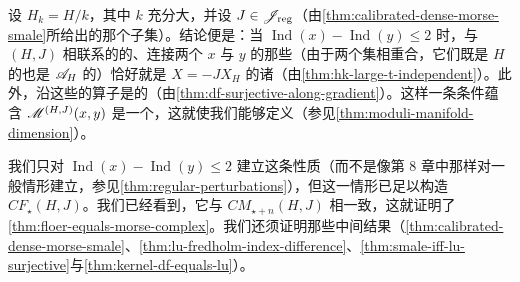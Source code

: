 设 $H_{k}=H/k$，其中 $k$ 充分大，并设 $J\in\mathscr{J}_{\mathrm{reg}}$（由\cref{thm:calibrated-dense-morse-smale}所给出的那个\trDense{}子集）。结论便是：当 $\operatorname{Ind}(x)-\operatorname{Ind}(y)\le 2$ 时，与 $(H,J)$ 相联系的\trFloerEquation{}的、连接两个\trCriticalPoint{} $x$ 与 $y$ 的那些\trTrajectory（由于两个\trCriticalPoint{}集相重合，它们既是 $H$ 的\trCriticalPoint{}也是 $\mathscr{A}_{H}$ 的\trCriticalPoint）恰好就是\trSmale{}\trVectorField{} $X=-JX_{H}$ 的诸\trTrajectory（由\cref{thm:hk-large-t-independent}）。此外，沿这些\trTrajectory{}\trLinearization{}的\trFloer{}算子是\trSurjective{}的（由\cref{thm:df-surjective-along-gradient}）。这样一条\trRegularity{}条件蕴含 $\mathscr{M}^{(H,J)}(x,y)$ 是一个\trManifold，这就使我们能够定义\trFloerComplex{}（参见\cref{thm:moduli-manifold-dimension}）。

我们只对 $\operatorname{Ind}(x)-\operatorname{Ind}(y)\le 2$ 建立这条\trRegularity{}性质（而不是像第 8 章中那样对一般情形建立，参见\cref{thm:regular-perturbations}），但这一情形已足以构造\trFloerComplex{} $CF_{\star}(H,J)$。我们已经看到，它与\trMorseComplex{} $CM_{\star+n}(H,J)$ 相一致，这就证明了\cref{thm:floer-equals-morse-complex}。我们还须证明那些中间结果（\cref{thm:calibrated-dense-morse-smale}、\cref{thm:lu-fredholm-index-difference}、\cref{thm:smale-iff-lu-surjective}与\cref{thm:kernel-df-equals-lu}）。

